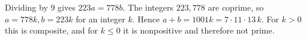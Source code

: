 Dividing by $9$ gives $223a=778b$. The integers $223,778$ are coprime, so $a=778k,b=223k$ for an integer $k$. Hence $a+b=1001k=7\cdot11\cdot13\,k$. For $k>0$ this is composite, and for $k\le0$ it is nonpositive and therefore not prime.
